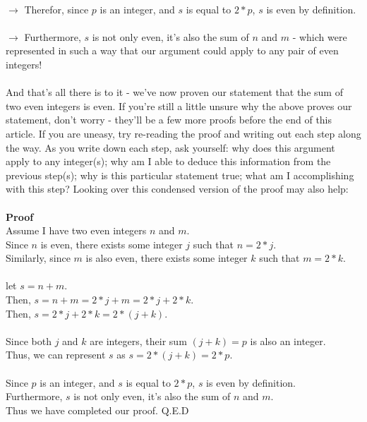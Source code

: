 \documentclass[a4paper,12pt]{article}
\begin{document}
\\
$\rightarrow$ Therefor, since $p$ is an integer, and $s$ is equal to $2*p$, $s$ is even by definition.\\ 
\\
$\rightarrow$ Furthermore, $s$ is not only even, it's also the sum of $n$ and $m$ - which were represented in such a way that our argument could apply to any pair of even integers! \\
\\
And that's all there is to it - we've now proven our statement that the sum of two even integers is even. If you're still a little unsure why the above proves our statement, don't worry - they'll be a few more proofs before the end of this article. If you are uneasy, try re-reading the proof and writing out each step along the way. As you write down each step, ask yourself: why does this argument apply to any integer(s); why am I able to deduce this information from the previous step(s); why is this particular statement true; what am I accomplishing with this step? Looking over this condensed version of the proof may also help:\\
\\
\textbf{Proof}\\
Assume I have two even integers $n$ and $m$. \\
Since $n$ is even, there exists some integer $j$ such that $n = 2*j$. \\
Similarly, since $m$ is also even, there exists some integer $k$ such that $m = 2*k$. \\
\\
let $s = n + m$.\\
Then, $s = n + m = 2*j + m = 2*j + 2*k$.\\
Then, $s = 2*j + 2*k = 2*(j + k)$. \\
\\
Since both $j$ and $k$ are integers, their sum $(j + k) = p$ is also an integer.\\
Thus, we can represent $s$ as $s = 2*(j + k) = 2*p$.\\ 
\\
Since $p$ is an integer, and $s$ is equal to $2*p$, $s$ is even by definition.\\ 
Furthermore, $s$ is not only even, it's also the sum of $n$ and $m$.\\
Thus we have completed our proof. Q.E.D
\end{document}
